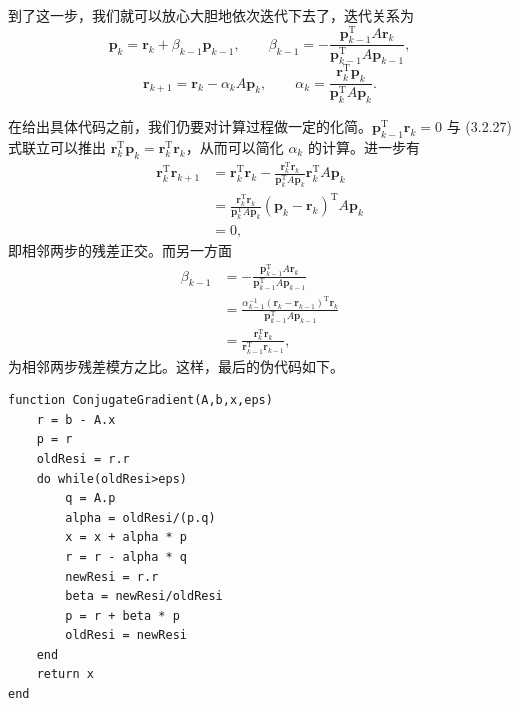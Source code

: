 到了这一步，我们就可以放心大胆地依次迭代下去了，迭代关系为
\begin{equation}
\bm p_k=\bm r_k+\beta_{k-1}\bm p_{k-1},\qquad
\beta_{k-1}=-\frac{\bm p_{k-1}^{\mathrm T}A\bm r_k}{\bm p_{k-1}^{\mathrm T}A\bm p_{k-1}},
\tag{3.2.27}
\end{equation}
\begin{equation}
\bm r_{k+1}=\bm r_k-\alpha_kA\bm p_k,\qquad
\alpha_k=\frac{\bm r_k^{\mathrm T}\bm p_k}{\bm p_k^{\mathrm T}A\bm p_k}.
\tag{3.2.28}
\end{equation}

在给出具体代码之前，我们仍要对计算过程做一定的化简。$\bm p_{k-1}^{\mathrm T}\bm r_k=0$ 与 (3.2.27) 式联立可以推出 $\bm r_k^{\mathrm T}\bm p_k=\bm r_k^{\mathrm T}\bm r_k$，从而可以简化 $\alpha_k$ 的计算。进一步有
\begin{equation}
\begin{aligned}
\bm r_k^{\mathrm T}\bm r_{k+1}
&=\bm r_k^{\mathrm T}\bm r_k-
\frac{\bm r_k^{\mathrm T}\bm r_k}{\bm p_k^{\mathrm T}A\bm p_k}\bm r_k^{\mathrm T}A\bm p_k\\
&=\frac{\bm r_k^{\mathrm T}\bm r_k}{\bm p_k^{\mathrm T}A\bm p_k}
(\bm p_k-\bm r_k)^{\mathrm T}A\bm p_k\\
&=0,
\end{aligned}
\tag{3.2.29}
\end{equation}
即相邻两步的残差正交。而另一方面
\begin{equation}
\begin{aligned}
\beta_{k-1}
&=-\frac{\bm p_{k-1}^{\mathrm T}A\bm r_k}{\bm p_{k-1}^{\mathrm T}A\bm p_{k-1}}\\
&=\frac{\alpha_{k-1}^{-1}(\bm r_k-\bm r_{k-1})^{\mathrm T}\bm r_k}{\bm p_{k-1}^{\mathrm T}A\bm p_{k-1}}\\
&=\frac{\bm r_k^{\mathrm T}\bm r_k}{\bm r_{k-1}^{\mathrm T}\bm r_{k-1}},
\end{aligned}
\tag{3.2.30}
\end{equation}
为相邻两步残差模方之比。这样，最后的伪代码如下。

\begin{algorithmBox}
\begin{lstlisting}[style=bellacode]
function ConjugateGradient(A,b,x,eps)
    r = b - A.x
    p = r
    oldResi = r.r
    do while(oldResi>eps)
        q = A.p
        alpha = oldResi/(p.q)
        x = x + alpha * p
        r = r - alpha * q
        newResi = r.r
        beta = newResi/oldResi
        p = r + beta * p
        oldResi = newResi
    end
    return x
end
\end{lstlisting}
\end{algorithmBox}

